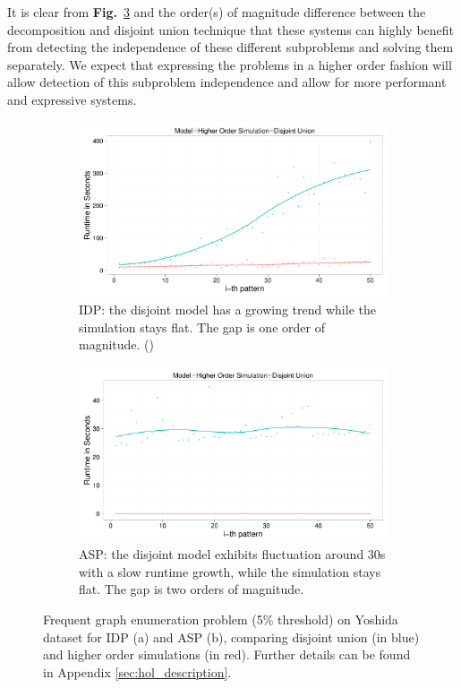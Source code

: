 It is clear from \textbf{Fig.}~\ref{fig:decomposition_fol} and the order(s) of magnitude difference between the decomposition and disjoint union technique that these systems can highly benefit from detecting the independence of these different subproblems and solving them separately.
We expect that expressing the problems in a higher order fashion will allow detection of this subproblem independence and allow for more performant and expressive systems.
\begin{figure}[thb]
\vspace{-2em}
\centering
\begin{subfigure}{.44\textwidth}
  \centering
\includegraphics[scale=0.12]{extra/figure_comparison_yoshida.pdf}
\caption{\footnotesize{IDP: the disjoint model has a growing trend while the simulation stays flat. The gap is one order of magnitude. (\cite{ilp_graph_mining})}}
  \label{fig:decomposition_idp}
\end{subfigure}%
\hfill
\begin{subfigure}{0.46\textwidth}
  \centering
 \includegraphics[scale=0.12]{extra/asp_fol_vs_decomposed_yoshida.pdf}
 \caption{\footnotesize{ASP: the disjoint model exhibits fluctuation around 30s with a slow runtime growth, while the simulation stays flat. The gap is two orders of magnitude.}}
  \label{fig:decomposition_asp}
\end{subfigure}
\caption{\footnotesize{Frequent graph enumeration problem (5\% threshold) on Yoshida dataset for IDP (a) and ASP (b), comparing disjoint union (in blue) and higher order simulations (in red). Further details can be found in Appendix \ref{sec:hol_description}.}}
\label{fig:decomposition_fol}
\vspace{-2em}
\end{figure}